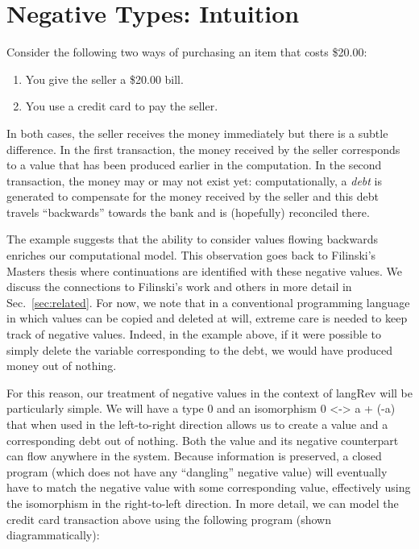 \documentclass[preprint]{sigplanconf}
\begin{document}
\section{Negative Types: Intuition} 

Consider the following two ways of purchasing an item that costs \$20.00:
\begin{enumerate}
\item You give the seller a \$20.00 bill.
\item You use a credit card to pay the seller.
\end{enumerate}
In both cases, the seller receives the money immediately but there is a
subtle difference. In the first transaction, the money received by the seller
corresponds to a value that has been produced earlier in the computation. In
the second transaction, the money may or may not exist yet: computationally,
a \emph{debt} is generated to compensate for the money received by the seller
and this debt travels ``backwards'' towards the bank and is (hopefully)
reconciled there. 

The example suggests that the ability to consider values flowing backwards
enriches our computational model. This observation goes back to Filinski's
Masters thesis where continuations are identified with these negative values.
We discuss the connections to Filinski's work and others in more detail in
Sec.~\ref{sec:related}. For now, we note that in a conventional programming
language in which values can be copied and deleted at will, extreme care is
needed to keep track of negative values. Indeed, in the example above, if it
were possible to simply delete the variable corresponding to the debt, we
would have produced money out of nothing. 

For this reason, our treatment of negative values in the context of
{{langRev}} will be particularly simple. We will have a type $0$ and an
isomorphism {{0 <-> a + (-a)}} that when used in the left-to-right direction
allows us to create a value and a corresponding debt out of nothing. Both the
value and its negative counterpart can flow anywhere in the system. Because
information is preserved, a closed program (which does not have any
``dangling'' negative value) will eventually have to match the negative value
with some corresponding value, effectively using the isomorphism in the
right-to-left direction. In more detail, we can model the credit card
transaction above using the following program (shown diagrammatically):
\end{document}
